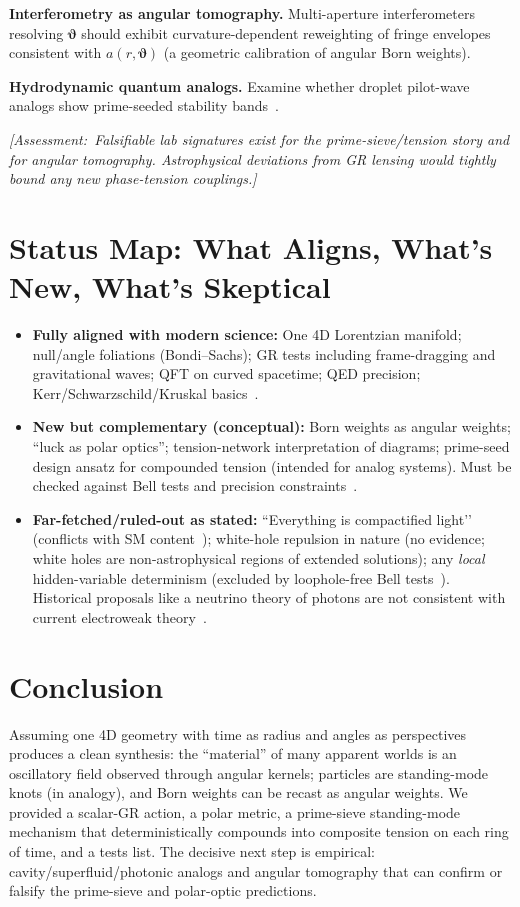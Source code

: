 \documentclass[reprint,amsmath,amssymb,aps,pra]{revtex4-2} %
\newcommand{\angb}{\boldsymbol{\vartheta}}     %
\newcommand{\Assessment}[1]{\par\smallskip\noindent\textit{\color{blue}[Assessment:\ #1]}\par\smallskip}
\begin{document}
\textbf{Interferometry as angular tomography.} Multi-aperture interferometers resolving $\angb$ should exhibit curvature-dependent reweighting of fringe envelopes consistent with $a(r,\angb)$ (a geometric calibration of angular Born weights).

\textbf{Hydrodynamic quantum analogs.} Examine whether droplet pilot-wave analogs show prime-seeded stability bands~\cite{CouderFort2006,Bush2015}.

\Assessment{Falsifiable lab signatures exist for the prime-sieve/tension story and for angular tomography. Astrophysical deviations from GR lensing would tightly bound any new phase-tension couplings.}

\section{Status Map: What Aligns, What’s New, What’s Skeptical}
\begin{itemize}
\item \textbf{Fully aligned with modern science:} One 4D Lorentzian manifold; null/angle foliations (Bondi–Sachs); GR tests including frame-dragging and gravitational waves; QFT on curved spacetime; QED precision; Kerr/Schwarzschild/Kruskal basics~\cite{Will2014,LIGO2016,GPB2011,BirrellDavies,ParkerToms,Kerr1963,Kraniotis2005,Kruskal1960,PDG2024}.
\item \textbf{New but complementary (conceptual):} Born weights as angular weights; “luck as polar optics”; tension-network interpretation of diagrams; prime-seed design ansatz for compounded tension (intended for analog systems). Must be checked against Bell tests and precision constraints~\cite{Hensen2015,Giustina2015,Shalm2015,Bohm1952}.
\item \textbf{Far-fetched/ruled-out as stated:} ``Everything is compactified light’’ (conflicts with SM content~\cite{PDG2024}); white-hole repulsion in nature (no evidence; white holes are non-astrophysical regions of extended solutions); any \emph{local} hidden-variable determinism (excluded by loophole-free Bell tests~\cite{Hensen2015,Giustina2015,Shalm2015}). Historical proposals like a neutrino theory of photons are not consistent with current electroweak theory~\cite{Perkins1965,PDG2024}.
\end{itemize}

\section{Conclusion}
Assuming one 4D geometry with time as radius and angles as perspectives produces a clean synthesis: the “material” of many apparent worlds is an oscillatory field observed through angular kernels; particles are standing-mode knots (in analogy), and Born weights can be recast as angular weights. We provided a scalar-GR action, a polar metric, a prime-sieve standing-mode mechanism that deterministically compounds into composite tension on each ring of time, and a tests list. The decisive next step is empirical: cavity/superfluid/photonic analogs and angular tomography that can confirm or falsify the prime-sieve and polar-optic predictions.
\end{document}
